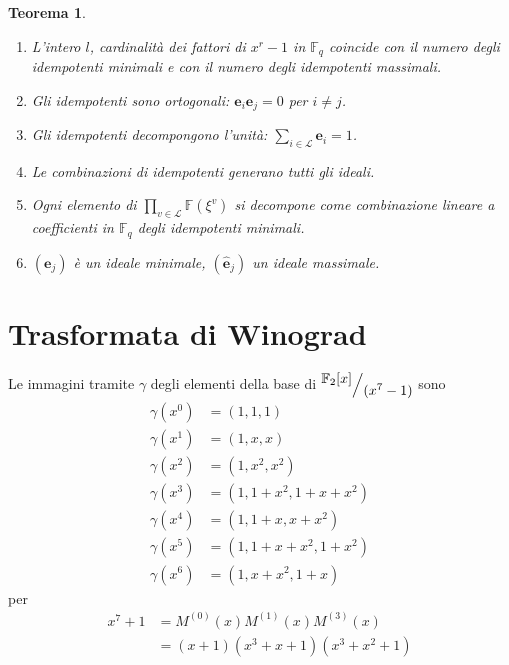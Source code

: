 \documentclass[mathserif]{beamer}
\def\quotient#1#2{%
   \raise1ex\hbox{$#1$}\Big/\lower1ex\hbox{$#2$}%
}
\newtheorem{teorema}{Teorema}
\begin{document}
\begin{frame}
\begin{teorema}
   \begin{enumerate}
      \item L'intero $l$, cardinalità dei fattori di $x^r-1$ in $\mathbb{F}_{q}$ coincide con il numero degli idempotenti minimali e con il numero degli idempotenti massimali.
      \item Gli idempotenti sono ortogonali: $\mathbf{e}_{i}\mathbf{e}_{j}  = \mathfrak{0}$ per $i \neq j$.
      \item Gli idempotenti decompongono l'unità: $\sum_{i \in \mathscr{L}}\mathbf{e}_{i}  = \mathfrak{1}$.
      \item Le combinazioni di idempotenti generano tutti gli ideali.
      \item Ogni elemento di $ \prod_{v\in \mathscr{L}} \mathbb{F}(\xi^{v})$ si decompone come combinazione lineare a coefficienti in $\mathbb{F}_{q}$ degli idempotenti minimali.
      \item $(\mathbf{e}_{j})$ è un ideale minimale, $(\mathbf{\hat{e}}_{j})$ un ideale massimale.
   \end{enumerate}
\end{teorema}
\end{frame}


\section{Trasformata di Winograd}

\thispagestyle{empty}
\begin{frame}
   \vspace{-1.2cm}
    Le immagini tramite $\gamma$ degli elementi della base di $ \quotient{\mathbb{F}_{2} \lbrack x \rbrack  }{ (x^{7} - 1)}$ sono
    \begin{align*}
      \gamma(x^0) &= (1,1,1)  \\
      \gamma(x^1) &= (1,x,x) \\
      \gamma(x^2) &= (1,x^2,x^2)  \\
      \gamma(x^3) &= (1,1+x^2,1+x+x^2)  \\
      \gamma(x^4) &= (1,1+x,x+x^2)  \\
      \gamma(x^5) &= (1,1+x+x^2,1+x^2)  \\
      \gamma(x^6) &= (1,x+x^2,1+x)
    \end{align*}
    per
    \begin{align*}
      x^{7} + 1 &= M^{(0)}(x) M^{(1)}(x) M^{(3)}(x) \\
		&= (x+1)(x^3 + x + 1)(x^3 + x^2 + 1)
    \end{align*}
\end{frame}
\end{document}
